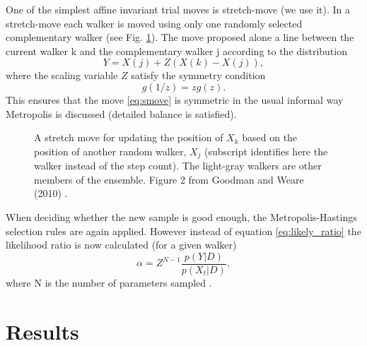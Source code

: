 \documentclass{wihuri}
\def\be{\begin{equation}}
\def\ee{\end{equation}}
\begin{document}



One of the simplest affine invariant trial moves is stretch-move (we use it). In a stretch-move each walker is moved using only one randomly selected complementary walker (see Fig. \ref{fig:smove}). The move proposed alone a line between the current walker k and the complementary walker j according to the distribution \cite{emceehammer}
\be \label{eq:smove}
Y = X(j) + Z(X(k)-X(j)),
\ee
where the scaling variable $Z$ satisfy the symmetry condition
\be \label{eq:symmetry_condition}
g(1/z) = zg(z).
\ee
This ensures that the move \ref{eq:smove} is symmetric in the usual informal way Metropolis is discussed (detailed balance is satisfied).


\begin{figure}
\centerline{}
\caption{A stretch move for updating the position of $X_{k}$ based on the position of another random walker, $X_{j}$ (subscript identifies here the walker instead of the step count). The light-gray walkers are other members of the ensemble. Figure 2 from Goodman and Weare (2010) \cite{ensemble1}.
\label{fig:smove}}
\end{figure}


When deciding whether the new sample is good enough, the Metropolis-Hastings selection rules are again applied. However instead of equation \ref{eq:likely_ratio} the likelihood ratio is now calculated (for a given walker)
\be \label{eq:likely_ratio_smove} 
\alpha = Z^{N-1}\frac{p(Y|D)}{p(X_{t}|D)},
\ee
where N is the number of parameters sampled \cite{ensemble1}. %




\section{Results}
\end{document}
